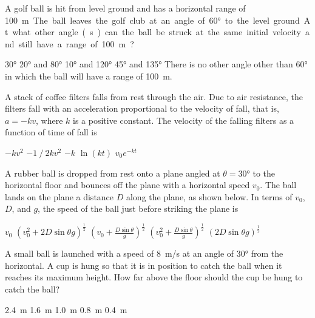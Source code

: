 \documentclass{../../../oss-apphys-exam}
\begin{document}
\begin{multicols*}{2}
\begin{questions}
    \question A golf ball is hit from level ground and has a horizontal range of
    \SI{100}\metre. The ball leaves the golf club at an angle of \ang{60} to
    the level ground. At what other angle(s) can the ball be struck at the same
    initial velocity and still have a range of \SI{100}{\metre}?
    \begin{choices}
      \choice\ang{30}
      \choice\ang{20} and \ang{80}
      \choice\ang{10} and \ang{120}
      \choice\ang{45} and \ang{135}
      \choice There is no other angle other than \ang{60} in which the ball will
      have a range of \SI{100}{\metre}.
    \end{choices}

    \question A stack of coffee filters falls from rest through the air. Due to
    air resistance, the filters fall with an acceleration proportional to the
    velocity of fall, that is, $a=-kv$, where $k$ is a positive constant. The
    velocity of the falling filters as a function of time of fall is
    \begin{choices}
      \choice $-kv^2$
      \choice $-1⁄2kv^2$
      \choice $-k$
      \choice $\ln(kt)$
      \choice $v_0e^{-kt}$
    \end{choices}
    \columnbreak
    
    \question A rubber ball is dropped from rest onto a plane angled at
    $\theta=\ang{30}$ to the horizontal floor and bounces off the plane with a
    horizontal speed $v_0$. The ball lands on the plane a distance $D$ along the
    plane, as shown below. In terms of $v_0$, $D$, and $g$, the speed of the
    ball just before striking the plane is
    \begin{choices}
      \choice $v_0$
      \choice $\displaystyle\left(v_0^2+2D\sin\theta g\right)^\frac{1}{2}$
      \choice $\displaystyle\left(v_0+\frac{D\sin\theta}{g}\right)^\frac{1}{2}$
      \choice $\displaystyle\left(v_0^2+\frac{D\sin\theta}{g}\right)^\frac{1}{2}$
      \choice $\displaystyle\left(2D\sin\theta g\right)^\frac{1}{2}$
    \end{choices}
  
    \question A small ball is launched with a speed of \SI{8}{m/s} at an angle
    of \ang{30} from the horizontal. A cup is hung so that it is in position to
    catch the ball when it reaches its maximum height. How far above the floor
    should the cup be hung to catch the ball?    
    \begin{choices}
      \choice\SI{2.4}{\metre}
      \choice\SI{1.6}{\metre}
      \choice\SI{1.0}{\metre}
      \choice\SI{.8}{\metre}
      \choice\SI{.4}{\metre}
    \end{choices}
    \columnbreak
    

\end{questions}
\end{multicols*}
\end{document}
